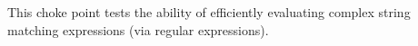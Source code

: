 
This choke point tests the ability of efficiently evaluating complex string
matching expressions (\eg via regular expressions).


